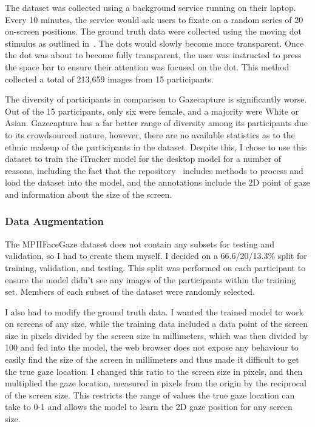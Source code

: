\documentclass{report}
\begin{document}
The dataset was collected using a background service running on their laptop. Every 10 minutes, the service would ask users to fixate on a random series of 20 on-screen positions. The ground truth data were collected using the moving dot stimulus as outlined in~\cite{kassner2014pupil}. The dots would slowly become more transparent. Once the dot was about to become fully transparent, the user was instructed to press the space bar to ensure their attention was focused on the dot. This method collected a total of 213,659 images from 15 participants. 

The diversity of participants in comparison to Gazecapture is significantly worse. Out of the 15 participants, only six were female, and a majority were White or Asian. Gazecapture has a far better range of diversity among its participants due to its crowdsourced nature, however, there are no available statistics as to the ethnic makeup of the participants in the dataset. Despite this, I chose to use this dataset to train the iTracker model for the desktop model for a number of reasons, including the fact that the repository~\cite{krafka2016eye,cheng2021survey} includes methods to process and load the dataset into the model, and the annotations include the 2D point of gaze and information about the size of the screen. 

\subsubsection{Data Augmentation}

The MPIIFaceGaze dataset does not contain any subsets for testing and validation, so I had to create them myself. I decided on a 66.6/20/13.3\% split for training, validation, and testing. This split was performed on each participant to ensure the model didn't see any images of the participants within the training set. Members of each subset of the dataset were randomly selected. 

I also had to modify the ground truth data. I wanted the trained model to work on screens of any size, while the training data included a data point of the screen size in pixels divided by the screen size in millimeters, which was then divided by 100 and fed into the model, the web browser does not expose any behaviour to easily find the size of the screen in millimeters and thus made it difficult to get the true gaze location. I changed this ratio to the screen size in pixels, and then multiplied the gaze location, measured in pixels from the origin by the reciprocal of the screen size. This restricts the range of values the true gaze location can take to 0-1 and allows the model to learn the 2D gaze position for any screen size. 
\end{document}
